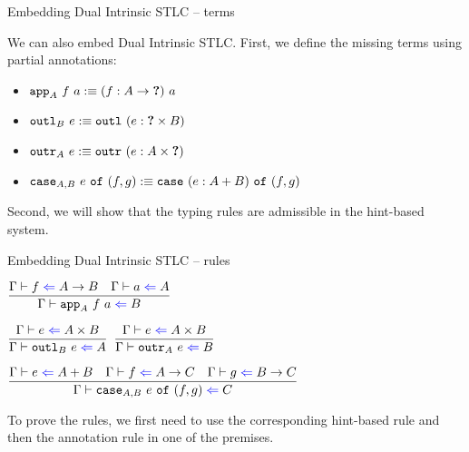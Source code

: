 \documentclass{beamer}
\begin{document}
\begin{frame}{Embedding Dual Intrinsic STLC -- terms}

We can also embed Dual Intrinsic STLC. First, we define the missing terms using partial annotations:

\begin{itemize}
  \item $\texttt{app}_{A}\ f\ a :\equiv (f : A \to \textbf{?})\ a$
  \item $\texttt{outl}_{B}\ e :\equiv \texttt{outl}\ (e : \textbf{?} \times B)$
  \item $\texttt{outr}_{A}\ e :\equiv \texttt{outr}\ (e : A \times \textbf{?})$
  \item $\texttt{case}_{A, B}\ e\ \texttt{of}\ (f, g) :\equiv \texttt{case}\ (e : A + B)\ \texttt{of}\ (f, g)$
\end{itemize}

\vspace{2em}

Second, we will show that the typing rules are admissible in the hint-based system.

\end{frame}

\begin{frame}{Embedding Dual Intrinsic STLC -- rules}

\begin{center}
  $\infrule{\check{f}{\Fun{A}{B}} \quad \check{a}{A}}{\check{\iapp{A}{f}{a}}{B}}$

  \vspace{2em}

  $\infrule{\check{e}{\Prod{A}{B}}}{\check{\ioutl{B}{e}}{A}}$ \enspace
  $\infrule{\check{e}{\Prod{A}{B}}}{\check{\ioutr{A}{e}}{B}}$

  \vspace{2em}

  $\infrule{\check{e}{\Sum{A}{B}} \quad \check{f}{\Fun{A}{C}} \quad \check{g}{\Fun{B}{C}}}{\check{\icase{A}{B}{e}{f}{g}}{C}}$
\end{center}

\vspace{2em}

To prove the rules, we first need to use the corresponding hint-based rule and then the annotation rule in one of the premises.

\end{frame}
\end{document}
